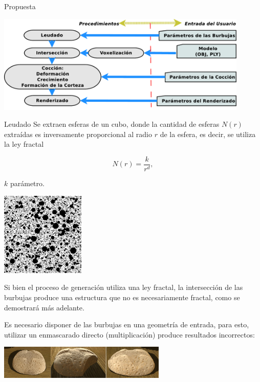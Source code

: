 \documentclass[spanish]{beamer}
\begin{document}
\begin{frame}{Propuesta}
\centerline{\includegraphics[width=12cm]{../figures/pipeline}}
\end{frame}

\begin{frame}{Leudado}
Se extraen esferas de un cubo, donde la cantidad de esferas $N(r)$ extraídas es inversamente proporcional al radio $r$ de la esfera, es decir, se utiliza la ley fractal

\begin{equation*}
N(r) = \frac{k}{r^{d}},
\end{equation*}

$k$ parámetro.

\centerline{\includegraphics[height=4cm]{../figures/bubbles}}
\end{frame}

\begin{frame}
Si bien el proceso de generación utiliza una ley fractal, la intersección de las burbujas produce una estructura que no es necesariamente fractal, como se demostrará más adelante.

\vspace{1cm}

Es necesario disponer de las burbujas en una geometría de entrada, para esto, utilizar un enmascarado directo (multiplicación) produce resultados incorrectos:

\centerline{\includegraphics[width=8cm]{../figures/intersectProblem}}
\end{frame}
\end{document}

